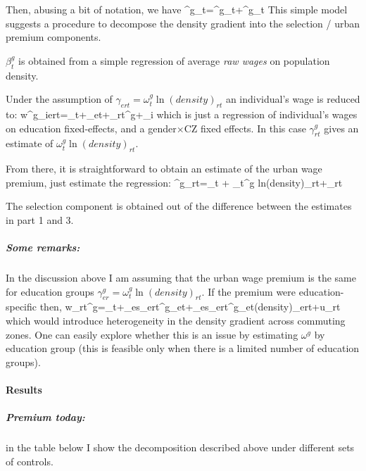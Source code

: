 Then, abusing a bit of notation, we have
\beqns
	\beta^g_t=\omega^g_t+\chi^g_t
\eeqns
This simple model suggests a procedure to decompose the density gradient into the selection / urban premium components.
\benu
	\item $\beta_t^g$ is obtained from a simple regression of average \textit{raw wages} on population density.
	\item Under the assumption of $\gamma_{ert}=\omega^g_t\ln(density)_{rt}$ an individual's wage is reduced to:
	\beqns
		w^g_{iert}=\alpha_t+\delta_{et}+\gamma_{rt}^g+\varepsilon_i
	\eeqns
	which is just a regression of individual's wages on education fixed-effects, and a gender$\times$CZ fixed effects. In this case $\gamma_{rt	}^g$ gives an estimate of $\omega^g_t\ln(density)_{rt}$.
	\item From there, it is straightforward to obtain an estimate of the urban wage premium, just estimate the regression:
	\beqns
		\gamma^g_{rt}=\eta_t + \omega_t^g ln(density)_{rt}+\nu_{rt}
	\eeqns 
	\item The selection component is obtained out of the difference between the estimates in part 1 and 3.
\eenu
\subparagraph{Some remarks:}
\bitem 
	\item In the discussion above I am assuming that the urban wage premium is the same for education groups $\gamma_{er}^g=\omega^g_t\ln(density)_{rt}$. If the premium were education-specific then,
	\beqns
		w_{rt}^g=\alpha_t+\sum_es_{ert}^g\delta_{et}+\sum_es_{ert}\omega^g_{et}\ln(density)_{ert}+u_{rt}
	\eeqns
	which would introduce heterogeneity in the density gradient across commuting zones. One can easily explore whether this is an issue by estimating $\omega^g$ by education group (this is feasible only when there is a limited number of education groups).
\eitem 

\paragraph{Results}
\subparagraph{Premium today:} in the table below I show the decomposition described above under different sets of controls.


